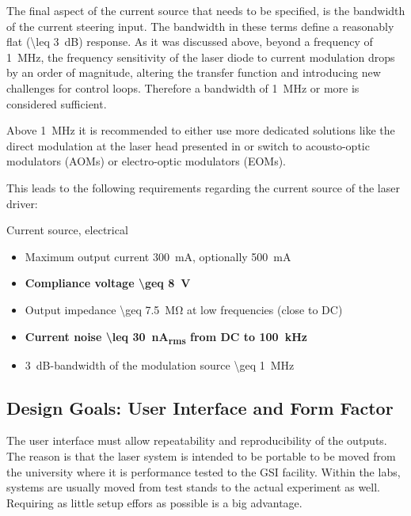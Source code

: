 The final aspect of the current source that needs to be specified, is the bandwidth of the current steering input. The bandwidth in these terms define a reasonably flat (\qty{\leq 3}{\dB}) response. As it was discussed above, beyond a frequency of \qty{1}{\MHz}, the frequency sensitivity of the laser diode to current modulation drops by an order of magnitude, altering the transfer function and introducing new challenges for control loops. Therefore a bandwidth of \qty{1}{\MHz} or more is considered sufficient.

Above \qty{1}{\MHz} it is recommended to either use more dedicated solutions like the direct modulation at the laser head presented in \cite{current_mod_paper} or switch to acousto-optic modulators (AOMs) or electro-optic modulators (EOMs).

This leads to the following requirements regarding the current source of the laser driver:

\begin{center}
    \begin{specifications}[label={lst:dgDrive_specs_electrical}]{Current source, electrical}
    \begin{itemize}
        \item Maximum output current \qty{300}{\mA}, optionally \qty{500}{\mA}
        \item \textbf{Compliance voltage \qty[text-series-to-math, reset-text-series = false, reset-math-version = false]{\geq 8}{\V}}
        \item Output impedance \qty{\geq 7.5}{\mega \ohm} at low frequencies (close to DC)
        \item \textbf{Current noise \qty[text-series-to-math, reset-text-series = false, reset-math-version = false]{\leq 30}{\nA_{rms}} from DC to \qty[text-series-to-math, reset-text-series = false, reset-math-version = false]{100}{\kHz}}
        \item \qty{3}{\dB}-bandwidth of the modulation source \qty{\geq 1}{\MHz}
    \end{itemize}
    \end{specifications}
\end{center}

\subsection{Design Goals: User Interface and Form Factor}
The user interface must allow repeatability and reproducibility of the outputs. The reason is that the laser system is intended to be portable to be moved from the university where it is performance tested to the GSI facility. Within the labs, systems are usually moved from test stands to the actual experiment as well. Requiring as little setup effors as possible is a big advantage.

